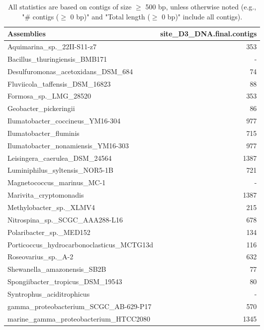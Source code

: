 \documentclass[12pt,a4paper]{article}
\begin{document}
\begin{table}[ht]
\begin{center}
\caption{All statistics are based on contigs of size $\geq$ 500 bp, unless otherwise noted (e.g., "\# contigs ($\geq$ 0 bp)" and "Total length ($\geq$ 0 bp)" include all contigs).}
\begin{tabular}{|l*{1}{|r}|}
\hline
Assemblies & site\_D3\_DNA.final.contigs \\ \hline
Aquimarina\_sp.\_22II-S11-z7 & 353 \\ \hline
Bacillus\_thuringiensis\_BMB171 & - \\ \hline
Desulfuromonas\_acetoxidans\_DSM\_684 & 74 \\ \hline
Fluviicola\_taffensis\_DSM\_16823 & 88 \\ \hline
Formosa\_sp.\_LMG\_28520 & 353 \\ \hline
Geobacter\_pickeringii & 86 \\ \hline
Ilumatobacter\_coccineus\_YM16-304 & 977 \\ \hline
Ilumatobacter\_fluminis & 715 \\ \hline
Ilumatobacter\_nonamiensis\_YM16-303 & 977 \\ \hline
Leisingera\_caerulea\_DSM\_24564 & 1387 \\ \hline
Luminiphilus\_syltensis\_NOR5-1B & 721 \\ \hline
Magnetococcus\_marinus\_MC-1 & - \\ \hline
Marivita\_cryptomonadis & 1387 \\ \hline
Methylobacter\_sp.\_XLMV4 & 215 \\ \hline
Nitrospina\_sp.\_SCGC\_AAA288-L16 & 678 \\ \hline
Polaribacter\_sp.\_MED152 & 134 \\ \hline
Porticoccus\_hydrocarbonoclasticus\_MCTG13d & 116 \\ \hline
Roseovarius\_sp.\_A-2 & 632 \\ \hline
Shewanella\_amazonensis\_SB2B & 77 \\ \hline
Spongiibacter\_tropicus\_DSM\_19543 & 80 \\ \hline
Syntrophus\_aciditrophicus & - \\ \hline
gamma\_proteobacterium\_SCGC\_AB-629-P17 & 570 \\ \hline
marine\_gamma\_proteobacterium\_HTCC2080 & 1345 \\ \hline
\end{tabular}
\end{center}
\end{table}
\end{document}
